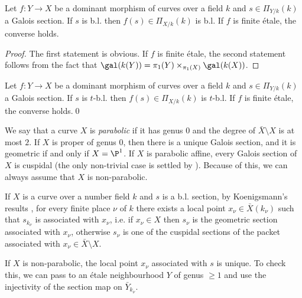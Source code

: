 
\begin{lemma}
\notready\label{morb}
	Let $f:Y\to X$ be a dominant morphism of curves over a field $k$ and $s\in\Pi_{Y/k}(k)$ a Galois section. If $s$ is b.l. then $f(s)\in\Pi_{X/k}(k)$ is b.l. If $f$ is finite étale, the converse holds.
	\begin{proof}
		The first statement is obvious. If $f$ is finite étale, the second statement follows from the fact that $\gal(k(Y))=\pi_{1}(Y)\times_{\pi_{1}(X)}\gal(k(X))$.
	\end{proof}
\end{lemma}

\begin{corollary}
\notready\label{mortb}
	Let $f:Y\to X$ be a dominant morphism of curves over a field $k$ and $s\in\Pi_{Y/k}(k)$ a Galois section. If $s$ is $t$-b.l. then $f(s)\in\Pi_{X/k}(k)$ is $t$-b.l. If $f$ is finite étale, the converse holds.\qed
\end{corollary}

We say that a curve $X$ is \emph{parabolic} if it has genus $0$ and the degree of $\bar{X}\setminus X$ is at most $2$. If $X$ is proper of genus $0$, then there is a unique Galois section, and it is geometric if and only if $X=\P^{1}$. If $X$ is parabolic affine, every Galois section of $X$ is cuspidal (the only non-trivial case is settled by \cite[Theorem A]{sch15}). Because of this, we can always assume that $X$ is non-parabolic.

If $X$ is a curve over a number field $k$ and $s$ is a b.l. section, by Koenigsmann's results \cite{koe05}, \cite[Proposition 1]{sti15} for every finite place $\nu$ of $k$ there exists a local point $x_{\nu}\in\bar{X}(k_{\nu})$ such that $s_{k_{\nu}}$ is associated with $x_{\nu}$, i.e. if $x_{\nu}\in X$ then $s_{\nu}$ is the geometric section associated with $x_{\nu}$, otherwise $s_{\nu}$ is one of the cuspidal sections of the packet associated with $x_{\nu}\in \bar{X}\setminus X$.

If $X$ is non-parabolic, the local point $x_{\nu}$ associated with $s$ is unique. To check this, we can pass to an étale neighbourhood $Y$ of genus $\ge 1$ and use the injectivity of the section map \cite[Proposition 75]{sti13} on $\bar{Y}_{k_{\nu}}$.

